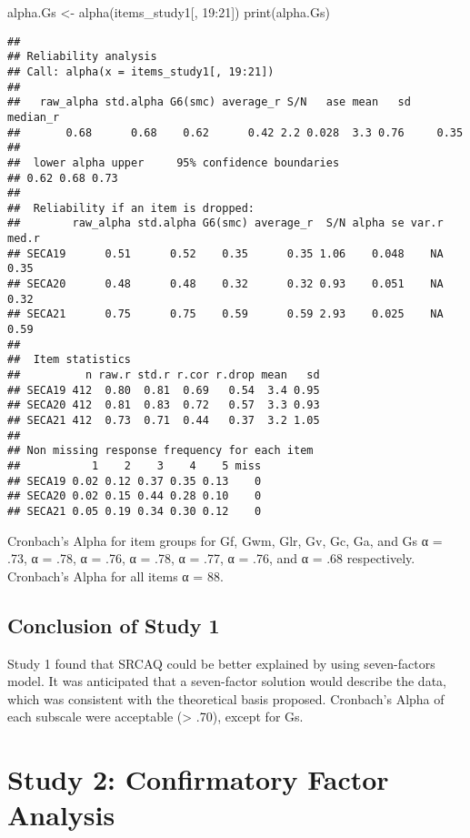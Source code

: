 \documentclass[
]{article}
\newenvironment{Shaded}{\begin{snugshade}}{\end{snugshade}}
\newcommand{\DecValTok}[1]{\textcolor[rgb]{0.00,0.00,0.81}{#1}}
\newcommand{\FunctionTok}[1]{\textcolor[rgb]{0.00,0.00,0.00}{#1}}
\newcommand{\NormalTok}[1]{#1}
\newcommand{\OtherTok}[1]{\textcolor[rgb]{0.56,0.35,0.01}{#1}}
\newcommand{\SpecialCharTok}[1]{\textcolor[rgb]{0.00,0.00,0.00}{#1}}
\begin{document}
\begin{Shaded}
\begin{Highlighting}[]
\NormalTok{alpha.Gs }\OtherTok{\textless{}{-}} \FunctionTok{alpha}\NormalTok{(items\_study1[, }\DecValTok{19}\SpecialCharTok{:}\DecValTok{21}\NormalTok{])}
\FunctionTok{print}\NormalTok{(alpha.Gs)}
\end{Highlighting}
\end{Shaded}

\begin{verbatim}
## 
## Reliability analysis   
## Call: alpha(x = items_study1[, 19:21])
## 
##   raw_alpha std.alpha G6(smc) average_r S/N   ase mean   sd median_r
##       0.68      0.68    0.62      0.42 2.2 0.028  3.3 0.76     0.35
## 
##  lower alpha upper     95% confidence boundaries
## 0.62 0.68 0.73 
## 
##  Reliability if an item is dropped:
##        raw_alpha std.alpha G6(smc) average_r  S/N alpha se var.r med.r
## SECA19      0.51      0.52    0.35      0.35 1.06    0.048    NA  0.35
## SECA20      0.48      0.48    0.32      0.32 0.93    0.051    NA  0.32
## SECA21      0.75      0.75    0.59      0.59 2.93    0.025    NA  0.59
## 
##  Item statistics 
##          n raw.r std.r r.cor r.drop mean   sd
## SECA19 412  0.80  0.81  0.69   0.54  3.4 0.95
## SECA20 412  0.81  0.83  0.72   0.57  3.3 0.93
## SECA21 412  0.73  0.71  0.44   0.37  3.2 1.05
## 
## Non missing response frequency for each item
##           1    2    3    4    5 miss
## SECA19 0.02 0.12 0.37 0.35 0.13    0
## SECA20 0.02 0.15 0.44 0.28 0.10    0
## SECA21 0.05 0.19 0.34 0.30 0.12    0
\end{verbatim}

Cronbach's Alpha for item groups for Gf, Gwm, Glr, Gv, Gc, Ga, and Gs α
= .73, α = .78, α = .76, α = .78, α = .77, α = .76, and α = .68
respectively. Cronbach's Alpha for all items α = 88.

\hypertarget{conclusion-of-study-1}{%
\subsection{Conclusion of Study 1}\label{conclusion-of-study-1}}

Study 1 found that SRCAQ could be better explained by using
seven-factors model. It was anticipated that a seven-factor solution
would describe the data, which was consistent with the theoretical basis
proposed. Cronbach's Alpha of each subscale were acceptable
(\textgreater{} .70), except for Gs.

\hypertarget{study-2-confirmatory-factor-analysis}{%
\section{Study 2: Confirmatory Factor
Analysis}\label{study-2-confirmatory-factor-analysis}}
\end{document}
